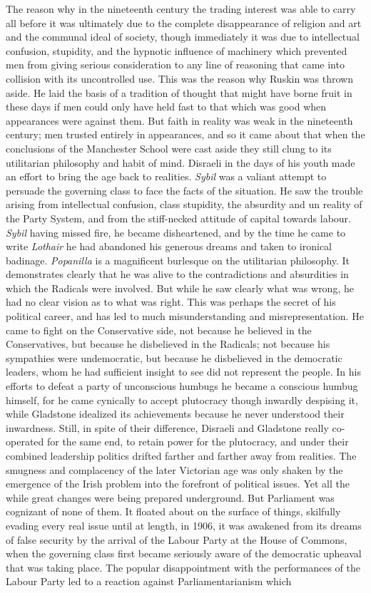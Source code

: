 \documentclass{book}
\begin{document}
The reason why in the nineteenth century the trading interest was able to carry all before it was ultimately due to the complete disappearance of religion and art and the communal ideal of society, though immediately it was due to intellectual confusion, stupidity, and the hypnotic influence of machinery which prevented men from giving serious consideration to any line of reasoning that came into collision with its uncontrolled use. This was the reason why Ruskin was thrown aside. He laid the basis of a tradition of thought that might have borne fruit in these days if men could only have held fast to that which was good when appearances were against them. But faith in reality was weak in the nineteenth century; men trusted entirely in appearances, and so it came about that when the conclusions of the Manchester School were cast aside they still clung to its utilitarian philosophy and habit of mind. Disraeli in the days of his youth made an effort to bring the age back to realities. \emph{Sybil} was a valiant attempt to persuade the governing class to face the facts of the situation. He saw the trouble arising from intellectual confusion, class stupidity, the absurdity and un reality of the Party System, and from the stiff-necked attitude of capital towards labour. \emph{Sybil} having missed fire, he became disheartened, and by the time he came to write \emph{Lothair} he had abandoned his generous dreams and taken to ironical badinage. \emph{Popanilla} is a magnificent burlesque on the utilitarian philosophy. It demonstrates clearly that he was alive to the contradictions and absurdities in which the Radicals were involved. But while he saw clearly what was wrong, he had no clear vision as to what was right. This was perhaps the secret of his political career, and has led to much misunderstanding and misrepresentation. He came to fight on the Conservative side, not because he believed in the Conservatives, but because he disbelieved in the Radicals; not because his sympathies were undemocratic, but because he disbelieved in the democratic leaders, whom he had sufficient insight to see did not represent the people. In his efforts to defeat a party of unconscious humbugs he became a conscious humbug himself, for he came cynically to accept plutocracy though inwardly despising it, while Gladstone idealized its achievements because he never understood their inwardness. Still, in spite of their difference, Disraeli and Gladstone really co-operated for the same end, to retain power for the plutocracy, and under their combined leadership politics drifted farther and farther away from realities. The smugness and complacency of the later Victorian age was only shaken by the emergence of the Irish problem into the forefront of political issues. Yet all the while great changes were being prepared underground. But Parliament was cognizant of none of them. It floated about on the surface of things, skilfully evading every real issue until at length, in 1906, it was awakened from its dreams of false security by the arrival of the Labour Party at the House of Commons, when the governing class first became seriously aware of the democratic upheaval that was taking place. The popular disappointment with the performances of the Labour Party led to a reaction against Parliamentarianism which 
\end{document}
